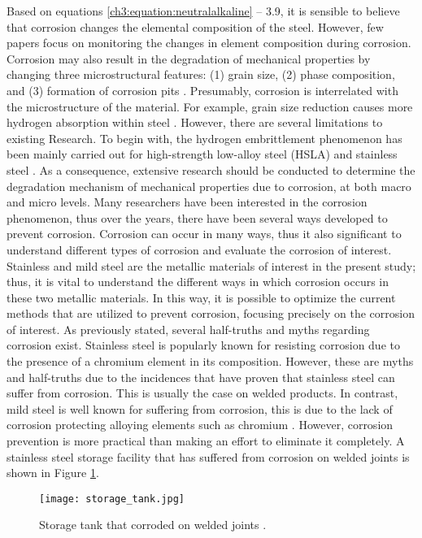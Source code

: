 Based on equations \ref{ch3:equation:neutralalkaline} – 3.9, it is sensible to believe that corrosion changes the elemental composition of the steel. However, few papers focus on monitoring the changes in element composition during corrosion. Corrosion may also result in the degradation of mechanical properties by changing three microstructural features: (1) grain size, (2) phase composition, and (3) formation of corrosion pits \cite{li2018effect}. Presumably, corrosion is interrelated with the microstructure of the material. For example, grain size reduction causes more hydrogen absorption within steel \cite{li2018effect}. However, there are several limitations to existing Research. To begin with, the hydrogen embrittlement phenomenon has been mainly carried out for high-strength low-alloy steel (HSLA) and stainless steel \cite{li2018effect}. As a consequence, extensive research should be conducted to determine the degradation mechanism of mechanical properties due to corrosion, at both macro and micro levels.  
Many researchers have been interested in the corrosion phenomenon, thus over the years, there have been several ways developed to prevent corrosion. Corrosion can occur in many ways, thus it also significant to understand different types of corrosion and evaluate the corrosion of interest. Stainless and mild steel are the metallic materials of interest in the present study; thus, it is vital to understand the different ways in which corrosion occurs in these two metallic materials. In this way, it is possible to optimize the current methods that are utilized to prevent corrosion, focusing precisely on the corrosion of interest.
As previously stated, several half-truths and myths regarding corrosion exist. Stainless steel is popularly known for resisting corrosion due to the presence of a chromium element in its composition. However, these are myths and half-truths due to the incidences that have proven that stainless steel can suffer from corrosion. This is usually the case on welded products. In contrast, mild steel is well known for suffering from corrosion, this is due to the lack of corrosion protecting alloying elements such as chromium \cite{hackerman1987theory}. However, corrosion prevention is more practical than making an effort to eliminate it completely. A stainless steel storage facility that has suffered from corrosion on welded joints is shown in Figure \ref{ch3:figure:tank}.
 
\begin{figure}[H]
    \centering
    \texttt{[image: storage\_tank.jpg]}
    \caption{Storage tank that corroded on welded joints \cite{karayan2014weld}.}
    \label{ch3:figure:tank}
\end{figure}

